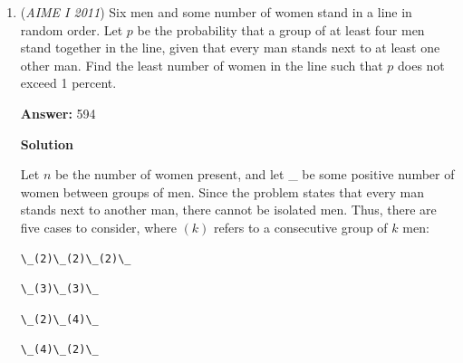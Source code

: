 \begin{enumerate}
 
For the first equation, we can see that for it to hold, $a$ and $b$ must be at least $3$, as the remainders become constant. For the second equation, we can rearrange it.

 $2^{a-b}=1 (mod 125)$.

 Let $d=a-b$  be the smallest positive integer satisfying the condition. When we find $d$, we can find $b$. We can use Euler's totient theorem and see that $d=100$. Therefore $b=a-100$. We can now use the fact that $d=100$ to solve for $b$.

 It happens that since the modular congruence for $8$ can be satisfied at the minimum when $b=3$, then the cycle starts at $b=3$ and cycles every $d=100$ terms.

 $S=2^{3}-1=7$.

 So the answer is $\boxed{007}$.~jamespudi

 \href{https://mathproblemsolvingskills.wordpress.com/}{MathProblemSolvingSkills.com}

 


	\item (\textit{AIME I 2011}) Six men and some number of women stand in a line in random order.  Let $p$ be the probability that a group of at least four men stand together in the line, given that every man stands next to at least one other man.  Find the least number of women in the line such that $p$ does not exceed 1 percent.


 
 \textbf{Answer: }594



\textbf{Solution}

Let $n$ be the number of women present, and let \_ be some positive number of women between groups of men.  Since the problem states that every man stands next to another man, there cannot be isolated men.  Thus, there are five cases to consider, where $(k)$ refers to a consecutive group of $k$ men:

 \begin{verbatim}
\_(2)\_(2)\_(2)\_
\end{verbatim}

\begin{verbatim}
\_(3)\_(3)\_
\end{verbatim}

\begin{verbatim}
\_(2)\_(4)\_
\end{verbatim}

\begin{verbatim}
\_(4)\_(2)\_
\end{verbatim}


\end{enumerate}
